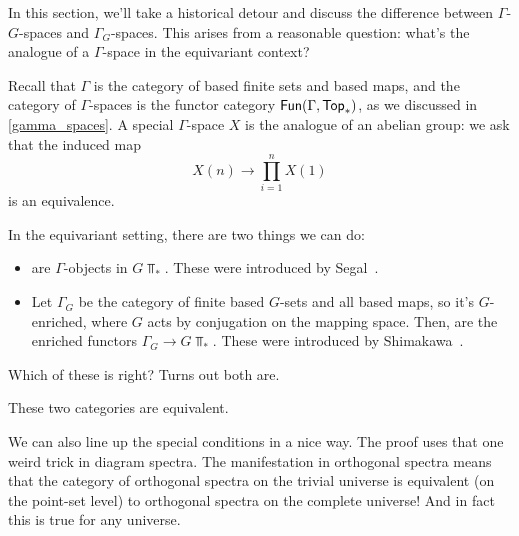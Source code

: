 \label{equivariant_gamma_space}
In this section, we'll take a historical detour and discuss the difference between $\Gamma$-$G$-spaces and
$\Gamma_G$-spaces. This arises from a reasonable question: what's the analogue of a $\Gamma$-space in the
equivariant context?

Recall that $\Gamma$ is the category of based finite sets and based maps, and the category of $\Gamma$-spaces is
the functor category $\mathsf{Fun}(\Gamma, \mathsf{Top}_*)$, as we discussed in \cref{gamma_spaces}. A special $\Gamma$-space $X$
is the analogue of an abelian group: we ask that the induced map
\[X(n)\longrightarrow\prod_{i=1}^n X(1)\]
is an equivalence.

In the equivariant setting, there are two things we can do:
\begin{itemize}
	\item {} are $\Gamma$-objects in $G\Top_*$. These were introduced by
	Segal~\cite{SegalEquivariant}.
	\item Let $\Gamma_G$ be the category of finite based $G$-sets and all based maps, so it's $G$-enriched, where
	$G$ acts by conjugation on the mapping space. Then,  are the enriched functors
	$\Gamma_G\to G\Top_*$. These were introduced by Shimakawa~\cite{Shi89}.
\end{itemize}
Which of these is right? Turns out both are.
\begin{thm}
\label{shimgamma}
These two categories are equivalent.
\end{thm}
We can also line up the special conditions in a nice way. The proof uses that one weird trick in diagram spectra.
The manifestation in orthogonal spectra means that the category of orthogonal spectra on the trivial universe is
equivalent (on the point-set level) to orthogonal spectra on the complete universe! And in fact this is true for
any universe.

